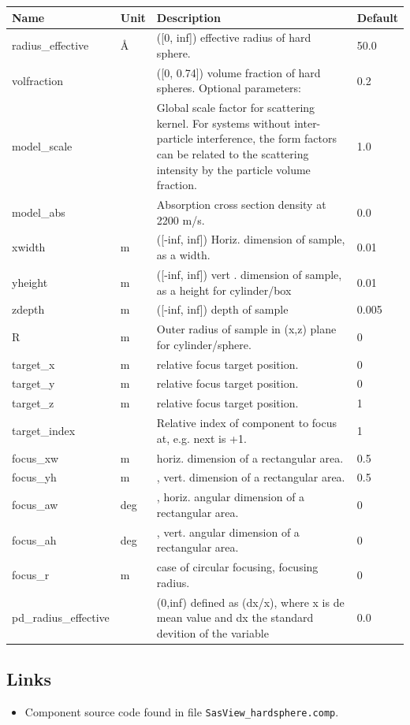 \begin{longtable}{p{}p{}p{}p{}}
\toprule
\textbf{Name} & \textbf{Unit} & \textbf{Description} & \textbf{Default} \\
\midrule
\endhead
radius\_effective & \AA{} & ([0, inf]) effective radius of hard sphere. & 50.0 \\
volfraction &  & ([0, 0.74]) volume fraction of hard spheres. Optional parameters: & 0.2 \\
model\_scale &   & Global scale factor for scattering kernel. For systems without inter-particle interference, the form factors can be related to the scattering intensity by the particle volume fraction. & 1.0 \\
model\_abs &   & Absorption cross section density at 2200 m/s. & 0.0 \\
xwidth & m & ([-inf, inf]) Horiz. dimension of sample, as a width. & 0.01 \\
yheight & m & ([-inf, inf]) vert . dimension of sample, as a height for cylinder/box & 0.01 \\
zdepth & m & ([-inf, inf]) depth of sample & 0.005 \\
R & m & Outer radius of sample in (x,z) plane for cylinder/sphere. & 0 \\
target\_x & m & relative focus target position. & 0 \\
target\_y & m & relative focus target position. & 0 \\
target\_z & m & relative focus target position. & 1 \\
target\_index &   & Relative index of component to focus at, e.g. next is +1. & 1 \\
focus\_xw & m & horiz. dimension of a rectangular area. & 0.5 \\
focus\_yh & m & , vert. dimension of a rectangular area. & 0.5 \\
focus\_aw & deg & , horiz. angular dimension of a rectangular area. & 0 \\
focus\_ah & deg & , vert. angular dimension of a rectangular area. & 0 \\
focus\_r & m & case of circular focusing, focusing radius. & 0 \\
pd\_radius\_effective &  & (0,inf) defined as (dx/x), where x is de mean value and dx the standard devition of the variable & 0.0 \\
\bottomrule
\end{longtable}

\subsection*{Links}
\begin{itemize}
  \item Component source code found in file \texttt{SasView\_hardsphere.comp}.
\end{itemize}
